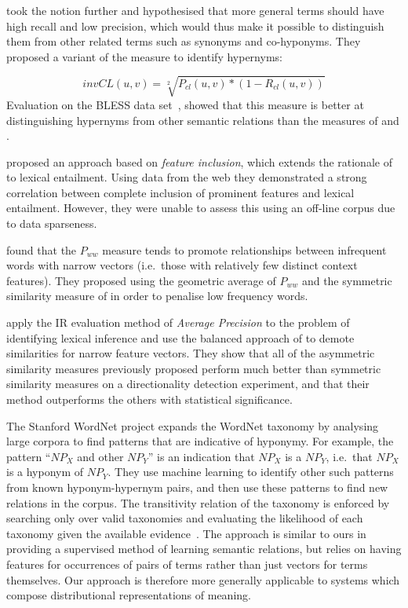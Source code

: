 \documentclass[11pt]{article}
\begin{document}
 took the notion further and hypothesised that more general terms should have high recall and low precision, which would thus make it possible to distinguish them from other related terms such as synonyms and co-hyponyms.  They proposed a variant of the  measure to identify hypernyms:

\[
invCL(u,v) = \sqrt[2]{P_{cl}(u,v)*(1-R_{cl}(u,v))}
\]
Evaluation on the BLESS data set~\cite{Baroni2011}, showed that this measure is  better at distinguishing hypernyms from other semantic relations than the measures of  and .

 proposed an approach based on \emph{feature inclusion}, which extends the rationale of~ to lexical entailment. Using data from the web they demonstrated a strong correlation between complete inclusion of prominent features and lexical entailment. However, they were unable to assess this using an off-line corpus due to data sparseness.

 found that the $P_{ww}$ measure tends to promote relationships between infrequent words with narrow vectors (i.e.~those with relatively few distinct context features).  They proposed using the geometric average of $P_{ww}$ and the symmetric similarity measure of  in order to penalise low frequency words.   

  apply the IR evaluation method of \emph{Average Precision} to the problem of identifying lexical inference and use the balanced approach of  to demote similarities for narrow feature vectors.  They show that all of the asymmetric similarity measures previously proposed perform much better than symmetric similarity measures on a directionality detection experiment, and that their method outperforms the others with statistical significance.

The Stanford WordNet project \cite{Snow:04} expands the WordNet
taxonomy by analysing large corpora to find patterns that are
indicative of hyponymy. For example, the pattern ``$\mathit{NP}_X$ and
other $\mathit{NP}_Y$'' is an indication that $\mathit{NP}_X$ is a
$\mathit{NP}_Y$, i.e.~that $\mathit{NP}_X$ is a hyponym of
$\mathit{NP}_Y$. They use machine learning to identify other such
patterns from known hyponym-hypernym pairs, and then use these
patterns to find new relations in the corpus. The
transitivity relation of the taxonomy is enforced by searching only over valid
taxonomies and evaluating the likelihood of each taxonomy given the
available evidence~\cite{Snow:06}. The approach is similar to
ours in providing a supervised method of learning semantic relations, but relies on having features for occurrences of pairs of terms rather than just vectors for terms themselves. Our approach is therefore more generally applicable to systems which compose distributional
representations of meaning.
\end{document}
